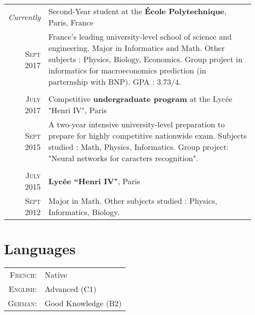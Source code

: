 \documentclass[a4paper,10pt]{article} %
\begin{document}
\begin{tabularx}{\linewidth}{r|X}
\emph{Currently} & {\large Second-Year student at the \textbf{École Polytechnique}, Paris, France }\\
\textsc{Sept} 2017 & \small{France’s leading university-level school of science and engineering.
Major in Informatics and Math. Other subjects : Physics, Biology, Economics.
Group project in informatics for macroeconomics prediction (in parternship with BNP).
GPA : $3.73/4$.}
\\ & \\

\textsc{July 2017} & {\large Competitive \textbf{undergraduate program} at the Lycée "Henri IV", Paris}\\
\textsc{Sept 2015} & \small{A two-year intensive university-level preparation
to prepare for highly competitive nationwide exam.
Subjects studied : Math, Physics, Informatics. Group project: "Neural networks for caracters recognition".}
\\&\\

\textsc{July 2015} & {\large \textbf{Lycée ``Henri IV"}, Paris}\\
\textsc{Sept 2012} & \small{Major in Math. Other subjects studied : Physics, Informatics, Biology.}
\end{tabularx}


\section{Languages}

\begin{tabular}{rl}
  \textsc{French:} & Native \\
  \textsc{English:} & Advanced (C1)\\
  \textsc{German:} & Good Knowledge (B2)\\
\end{tabular}

\end{document}
